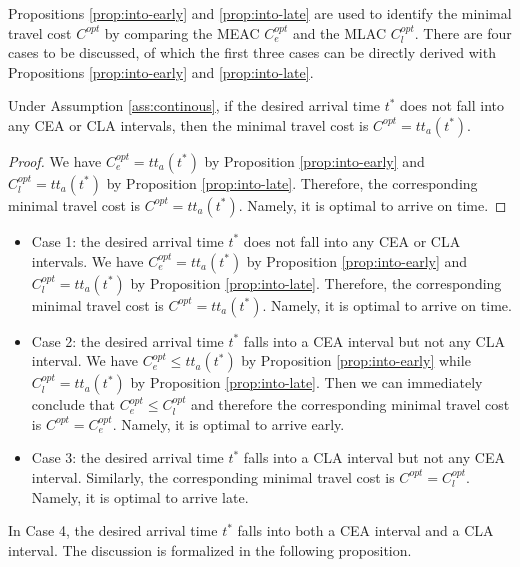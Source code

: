  Propositions \ref{prop:into-early} and \ref{prop:into-late} are used to identify the minimal travel cost $C^{opt}$ by comparing the MEAC $C_e^{opt}$ and the MLAC $C_l^{opt}$. There are four cases to be discussed, of which the first three cases can be directly derived with Propositions \ref{prop:into-early} and \ref{prop:into-late}. 

\begin{corollary}
     Under Assumption \ref{ass:continous},  if the desired arrival time $t^*$ does not fall into any CEA or CLA intervals, then the minimal travel cost is $C^{opt} = tt_a(t^*)$. 
\end{corollary}
\begin{proof}
    We have $C_e^{opt} = tt_a(t^*)$ by Proposition \ref{prop:into-early} and $C_l^{opt} = tt_a(t^*)$ by Proposition \ref{prop:into-late}. Therefore, the corresponding minimal travel cost is $C^{opt} = tt_a(t^*)$. Namely, it is optimal to arrive on time. 
\end{proof}

 \begin{itemize}
     \item Case 1: the desired arrival time $t^*$ does not fall into any CEA or CLA intervals. We have $C_e^{opt} = tt_a(t^*)$ by Proposition \ref{prop:into-early} and $C_l^{opt} = tt_a(t^*)$ by Proposition \ref{prop:into-late}. Therefore, the corresponding minimal travel cost is $C^{opt} = tt_a(t^*)$. Namely, it is optimal to arrive on time. 
 
  \item  Case 2: the desired arrival time  $t^*$ falls into a CEA interval but not any CLA interval. We have $C_e^{opt} \le tt_a(t^*)$ by Proposition \ref{prop:into-early} while $C_l^{opt} = tt_a(t^*)$ by Proposition \ref{prop:into-late}.  Then we can immediately conclude that $C_e^{opt} \le C_l^{opt}$ and therefore the corresponding minimal travel cost is $C^{opt} = C_e^{opt}$. Namely, it is optimal to arrive early.  
 
  \item  Case 3: the desired arrival time $t^*$ falls into a CLA interval but not any CEA interval. Similarly, the corresponding minimal travel cost is $C^{opt} = C_l^{opt}$. Namely, it is optimal to arrive late. 
 \end{itemize}
 
In Case 4, the desired arrival time $t^*$ falls into both a CEA interval and a CLA interval. The discussion is formalized in the following proposition. 

